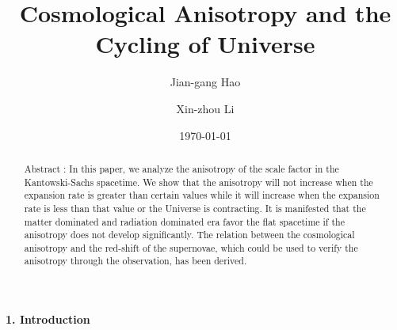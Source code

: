 \documentclass[a4paper,preprint]{revtex4}
\begin{document}
\title{Cosmological Anisotropy and the Cycling of Universe}%

\author{Jian-gang Hao}

\author{Xin-zhou Li}

%


\date{\today}%

\begin{abstract}
Abstract : In this paper, we analyze the anisotropy of the scale
factor in the Kantowski-Sachs spacetime. We show that the
anisotropy will not increase when the expansion rate is greater
than certain values while it will increase when the expansion rate
is less than that value or the Universe is contracting. It is
manifested that the matter dominated and radiation dominated era
favor the flat spacetime if the anisotropy does not develop
significantly. The relation between the cosmological anisotropy
and the red-shift of the supernovae, which could be used to verify
the anisotropy through the observation, has been derived.
\end{abstract}


\maketitle

\vspace{0.4cm} \noindent\textbf{1. Introduction} \vspace{0.4cm}
\end{document}
